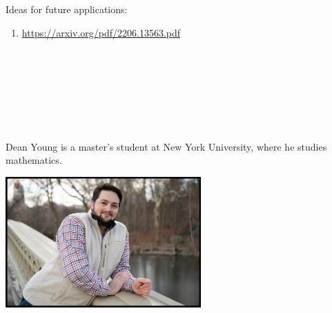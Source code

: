 \documentclass{book}
\theoremstyle{definition}
\newcounter{lcounter}
\begin{document}

Ideas for future applications:

\begin{enumerate}
\item \url{https://arxiv.org/pdf/2206.13563.pdf}
\end{enumerate}

\newpage 
\ \\
\ \\
\ \\
\ \\
\ \\
\ \\
\begin{center}
\begin{tcolorbox}[width=5in,colback={white},title={\begin{center}\texttt{About the Author} \addtocounter{lcounter}{1}  \end{center}},colbacktitle=Yellow,coltitle=black]
Dean Young is a master's student at New York University, where he studies mathematics. \\
\begin{center}
\includegraphics[width=7.5cm,height=5cm]{about.jpg}
\end{center}
\end{tcolorbox}
\end{center}
\end{document}
